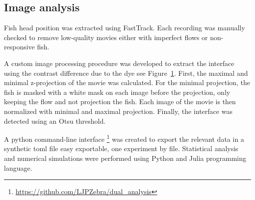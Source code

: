 \begin{appendices}
    \section{Image analysis}
    Fish head position was extracted using FastTrack. Each recording was manually checked to remove low-quality movies either with imperfect flows or non-responsive fish.

    A custom image processing procedure was developed to extract the interface using the contrast difference due to the dye see Figure~\ref{}. First, the maximal and minimal z-projection of the movie was calculated. For the minimal projection, the fish is masked with a white mask on each image before the projection, only keeping the flow and not projection the fish. Each image of the movie is then normalized with minimal and maximal projection. Finally, the interface was detected using an Otsu threshold.

    A python command-line interface \footnote{\url{https://github.com/LJPZebra/dual_analysis}} was created to export the relevant data in a synthetic toml file easy exportable, one experiment by file. Statistical analysis and numerical simulations were performed using Python and Julia programming language.


\end{appendices}
